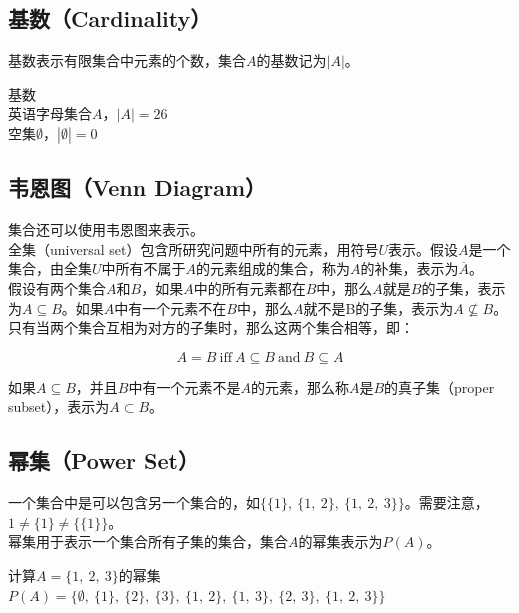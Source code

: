 \documentclass[12pt, openany, oneside]{book}
\begin{document}
\subsection{基数（Cardinality）}

基数表示有限集合中元素的个数，集合$ A $的基数记为$ |A| $。

\begin{tcolorbox}
	基数 \\
	英语字母集合$ A $，$ |A| = 26 $ \\
	空集$ \emptyset $，$ |\emptyset| = 0 $
\end{tcolorbox}

\subsection{韦恩图（Venn Diagram）}

集合还可以使用韦恩图来表示。 \\

全集（universal set）包含所研究问题中所有的元素，用符号$ U $表示。假设$ A $是一个集合，由全集$ U $中所有不属于$ A $的元素组成的集合，称为$ A $的补集，表示为$ \overline A $。 \\

假设有两个集合$ A $和$ B $，如果$ A $中的所有元素都在$ B $中，那么$ A $就是$ B $的子集，表示为$ A \subseteq B $。如果$ A $中有一个元素不在$ B $中，那么$ A $就不是B的子集，表示为$ A \nsubseteq B $。只有当两个集合互相为对方的子集时，那么这两个集合相等，即：

$$
	A = B\ \text{iff}\ A \subseteq B\ \text{and}\ B \subseteq A
$$

如果$ A \subseteq B $，并且$ B $中有一个元素不是$ A $的元素，那么称$ A $是$ B $的真子集（proper subset），表示为$ A \subset B $。

\subsection{幂集（Power Set）}

一个集合中是可以包含另一个集合的，如$ \{\{1\},\ \{1,\ 2\},\ \{1,\ 2,\ 3\}\} $。需要注意，$ 1 \neq \{1\} \neq \{\{1\}\} $。 \\

幂集用于表示一个集合所有子集的集合，集合$ A $的幂集表示为$ P(A) $。

\begin{tcolorbox}
	计算$ A = \{1,\ 2,\ 3\} $的幂集 \\
	$ P(A) = \{\emptyset,\ \{1\},\ \{2\},\ \{3\},\ \{1,\ 2\},\ \{1,\ 3\},\ \{2,\ 3\},\ \{1,\ 2,\ 3\}\} $
\end{tcolorbox}
\end{document}
